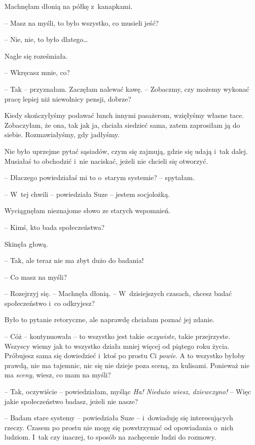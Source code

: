 \documentclass[oneside,polish,11pt,sfheadings]{mwbk}
\begin{document}
Machnęłam dłonią na półkę z~kanapkami. 

-- Masz na myśli, to było
wszystko, co musieli jeść?

-- Nie, nie, to było dlatego\ldots 

Nagle się roześmiała. 

-- Wkręcasz mnie, co?

-- Tak -- przyznałam. Zaczęłam nalewać kawę. -- Zobaczmy, czy możemy
wykonać pracę lepiej niż niewolnicy pensji, dobrze?

Kiedy skończyłyśmy podawać lunch innymi pasażerom, wzięłyśmy własne
tace. Zobaczyłam, że ona, tak jak ja, chciała siedzieć sama, zatem
zaprosiłam ją do siebie. Rozmawiałyśmy, gdy jadłyśmy.

Nie było uprzejme pytać sąsiadów, czym się zajmują, gdzie się udają i~tak dalej. Musiałaś to obchodzić i~nie naciskać, jeżeli nie chcieli się
otworzyć.

-- Dlaczego powiedziałaś mi to o~starym systemie? -- spytałam.

-- W~tej chwili -- powiedziała Suze -- jestem socjolożką.

Wyciągnęłam nieznajome słowo ze starych wspomnień.

-- Kimś, kto bada społeczeństwa?

Skinęła głową. 

-- Tak, ale teraz nie ma zbyt dużo do badania!

-- Co masz na myśli?

-- Rozejrzyj się. -- Machnęła dłonią. -- W~dzisiejszych czasach, chcesz
badać społeczeństwo i~co odkryjesz?

Było to pytanie retoryczne, ale naprawdę chciałam poznać jej zdanie.

-- Cóż -- kontynuowała -- to wszystko jest takie \textit{oczywiste}, takie
przejrzyste. Wszyscy wiemy jak to wszystko działa mniej więcej od
piątego roku życia. Próbujesz sama się dowiedzieć i~ktoś po prostu Ci
\textit{powie}. A to wszystko byłoby prawdą, nie ma tajemnic, nic się nie
dzieje poza sceną, za kulisami. Ponieważ nie ma \textit{sceny}, wiesz, co
mam na myśli?

-- Tak, oczywiście -- powiedziałam, myśląc \textit{Ha! Niedużo wiesz,
dziewczyno!} -- Więc jakie społeczeństwo badasz, jeżeli nie nasze?

-- Badam stare systemy -- powiedziała Suze -- i~dowiaduję się
interesujących rzeczy. Czasem po prostu nie mogę się powstrzymać od
opowiadania o~nich ludziom. I~tak czy inaczej, to sposób na zachęcenie
ludzi do rozmowy.
\end{document}
